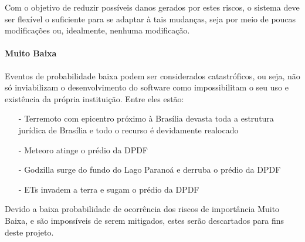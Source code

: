 \documentclass[12pt,a4paper]{report}
\begin{document}
Com o objetivo de reduzir possíveis danos gerados por estes riscos, o sistema deve ser flexível o suficiente para se adaptar à tais mudanças, seja por meio de poucas modificações ou, idealmente, nenhuma modificação.

\paragraph{Muito Baixa} Eventos de probabilidade baixa podem ser considerados catastróficos, ou seja, não só inviabilizam o desenvolvimento do software como impossibilitam o seu uso e existência da própria instituição. Entre eles estão:
\begin{itemize}
\item [-] Terremoto com epicentro próximo à Brasília devasta toda a estrutura jurídica de Brasília e todo o recurso é devidamente realocado
\item [-] Meteoro atinge o prédio da DPDF
\item [-] Godzilla surge do fundo do Lago Paranoá e derruba o prédio da DPDF
\item [-] ETs invadem a terra e sugam o prédio da DPDF
\end{itemize}


Devido a baixa probabilidade de ocorrência dos riscos de importância Muito Baixa, e são impossíveis de serem mitigados, estes serão descartados para fins deste projeto. 



\end{document}
